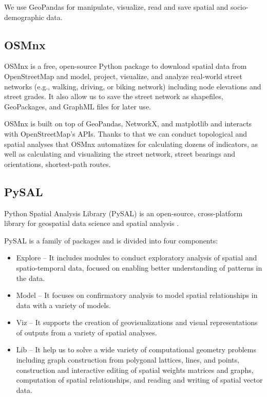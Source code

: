 {{We use GeoPandas for manipulate, visualize, read and save spatial and socio-demographic data. 

\subsection{OSMnx}
\label{subsection:osmnx}

OSMnx \cite{boeing_osmnx_2017} is a free, open-source Python package to download spatial data from OpenStreetMap and model, project, visualize, and analyze real-world street networks (e.g., walking, driving, or biking network) including node elevations and street grades. It also allow us to save the street network as shapefiles, GeoPackages, and GraphML files for later use.

OSMnx is built on top of GeoPandas, NetworkX, and matplotlib and interacts with OpenStreetMap's APIs. Thanks to that we can conduct topological and spatial analyses that OSMnx automatizes for calculating dozens of indicators, as well as calculating and visualizing the street network, street bearings and orientations, shortest-path routes.

\subsection{PySAL}

Python Spatial Analysis Library (PySAL) is an open-source, cross-platform library for geospatial data science and spatial analysis \cite{pysal2007}.

PySAL is a family of packages and is divided into four components:

\begin{itemize}
	\item Explore -- It includes modules to conduct exploratory analysis of spatial and spatio-temporal data, focused on enabling better understanding of patterns in the data.
	\item Model -- It focuses on confirmatory analysis to model spatial relationships in data with a variety of models.
	\item Viz -- It supports the creation of geovisualizations and visual representations of outputs from a variety of spatial analyses. 
	\item Lib -- It help us to solve a wide variety of computational geometry problems including graph construction from polygonal lattices, lines, and points, construction and interactive editing of spatial weights matrices and graphs, computation of spatial relationships, and reading and writing of spatial vector data.
\end{itemize}

}}
